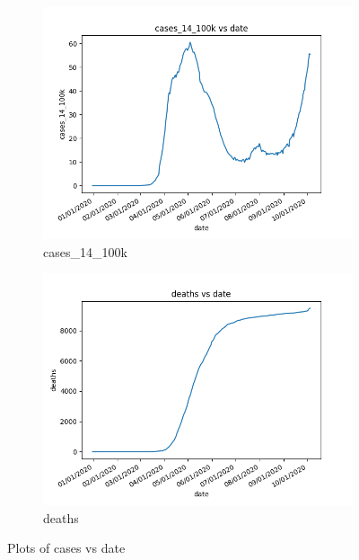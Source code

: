 \begin{figure}[h]
\begin{subfigure}[b]{0.24\linewidth}
        \includegraphics[width=\linewidth]{../figs/cases_14_100k.png}
        \caption{cases\_14\_100k}
    \end{subfigure}
    \begin{subfigure}[b]{0.24\linewidth}
        \includegraphics[width=\linewidth]{../figs/deaths.png}
        \caption{deaths}
    \end{subfigure}
    \caption{Plots of cases vs date}
\end{figure}

